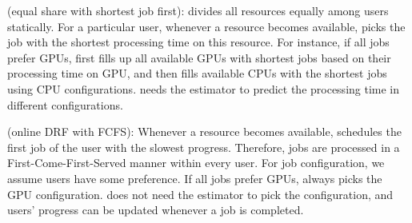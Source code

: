 \emph{\ESRP} (equal share with shortest job first): \ESRP divides all resources equally among users statically. 
For a particular user, whenever a resource becomes available, \ESRP picks the job with the shortest processing time on this resource. For instance, if all jobs prefer GPUs, \ESRP first fills up all available GPUs with shortest jobs based on their processing time on GPU, and then fills available CPUs with the shortest jobs using CPU configurations. \ESRP needs the estimator to predict the processing time in different configurations.

\emph{\DRFFIFO} (online DRF with FCFS): %
Whenever a resource becomes available, \DRFFIFO schedules the first job of the user with the slowest progress.  
Therefore, jobs are processed in a First-Come-First-Served manner within every user. 
For job configuration, we assume users have some preference. If all jobs prefer GPUs, \DRFFIFO always picks the GPU configuration. 
\DRFFIFO does not need the estimator to pick the configuration, and users' progress can be updated whenever a job is completed. 




